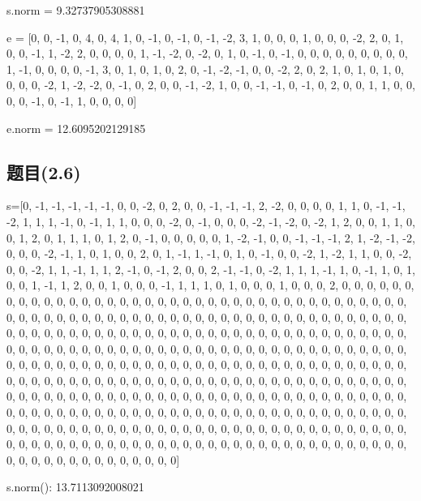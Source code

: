 \documentclass[12pt,a4paper]{article}
\numberwithin{equation}{section}
\begin{document}
s.norm =  9.32737905308881

\hspace*{\fill}

e = [0, 0, -1, 0, 4, 0, 4, 1, 0, -1, 0, -1, 0, -1, -2, 3, 1, 0, 0, 0, 1, 0, 0, 0, -2, 2, 0, 1, 0, 0, -1, 1, -2, 2, 0, 0, 0, 0, 1, -1, -2, 0, -2, 0, 1, 0, -1, 0, -1, 0, 0, 0, 0, 0, 0, 0, 0, 0, 1, -1, 0, 0, 0, 0, -1, 3, 0, 1, 0, 1, 0, 2, 0, -1, -2, -1, 0, 0, -2, 2, 0, 2, 1, 0, 1, 0, 1, 0, 0, 0, 0, -2, 1, -2, -2, 0, -1, 0, 2, 0, 0, -1, -2, 1, 0, 0, -1, -1, 0, -1, 0, 2, 0, 0, 1, 1, 0, 0, 0, 0, -1, 0, -1, 1, 0, 0, 0, 0]

e.norm = 12.6095202129185

\subsection{题目(2.6)}

s=[0, -1, -1, -1, -1, -1, 0, 0, -2, 0, 2, 0, 0, -1, -1, -1, 2, -2, 0, 0, 0, 0, 1, 1, 0, -1, -1, -2, 1, 1, 1, -1, 0, -1, 1, 1, 0, 0, 0, -2, 0, -1, 0, 0, 0, -2, -1, -2, 0, -2, 1, 2, 0, 0, 1, 1, 0, 0, 1, 2, 0, 1, 1, 1, 0, 1, 2, 0, -1, 0, 0, 0, 0, 0, 1, -2, -1, 0, 0, -1, -1, -1, 2, 1, -2, -1, -2, 0, 0, 0, -2, -1, 1, 0, 1, 0, 0, 2, 0, 1, -1, 1, -1, 0, 1, 0, -1, 0, 0, -2, 1, -2, 1, 1, 0, 0, -2, 0, 0, -2, 1, 1, -1, 1, 1, 2, -1, 0, -1, 2, 0, 0, 2, -1, -1, 0, -2, 1, 1, 1, -1, 1, 0, -1, 1, 0, 1, 0, 0, 1, -1, 1, 2, 0, 0, 1, 0, 0, 0, -1, 1, 1, 1, 0, 1, 0, 0, 0, 1, 0, 0, 0, 2, 0, 0, 0, 0, 0, 0, 0, 0, 0, 0, 0, 0, 0, 0, 0, 0, 0, 0, 0, 0, 0, 0, 0, 0, 0, 0, 0, 0, 0, 0, 0, 0, 0, 0, 0, 0, 0, 0, 0, 0, 0, 0, 0, 0, 0, 0, 0, 0, 0, 0, 0, 0, 0, 0, 0, 0, 0, 0, 0, 0, 0, 0, 0, 0, 0, 0, 0, 0, 0, 0, 0, 0, 0, 0, 0, 0, 0, 0, 0, 0, 0, 0, 0, 0, 0, 0, 0, 0, 0, 0, 0, 0, 0, 0, 0, 0, 0, 0, 0, 0, 0, 0, 0, 0, 0, 0, 0, 0, 0, 0, 0, 0, 0, 0, 0, 0, 0, 0, 0, 0, 0, 0, 0, 0, 0, 0, 0, 0, 0, 0, 0, 0, 0, 0, 0, 0, 0, 0, 0, 0, 0, 0, 0, 0, 0, 0, 0, 0, 0, 0, 0, 0, 0, 0, 0, 0, 0, 0, 0, 0, 0, 0, 0, 0, 0, 0, 0, 0, 0, 0, 0, 0, 0, 0, 0, 0, 0, 0, 0, 0, 0, 0, 0, 0, 0, 0, 0, 0, 0, 0, 0, 0, 0, 0, 0, 0, 0, 0, 0, 0, 0, 0, 0, 0, 0, 0, 0, 0, 0, 0, 0, 0, 0, 0, 0, 0, 0, 0, 0, 0, 0, 0, 0, 0, 0, 0, 0, 0, 0, 0, 0, 0, 0, 0, 0, 0, 0, 0, 0, 0, 0, 0, 0, 0, 0, 0, 0, 0, 0, 0, 0, 0, 0, 0, 0, 0, 0, 0, 0, 0, 0, 0, 0, 0, 0, 0, 0, 0, 0, 0, 0, 0, 0, 0, 0, 0, 0, 0, 0, 0, 0, 0, 0, 0, 0, 0, 0, 0, 0, 0, 0, 0, 0, 0, 0, 0, 0, 0, 0, 0, 0, 0, 0, 0, 0, 0, 0, 0, 0, 0, 0, 0, 0, 0, 0, 0, 0, 0, 0, 0, 0, 0, 0, 0, 0, 0, 0, 0, 0, 0, 0, 0, 0, 0, 0, 0, 0, 0, 0, 0]

s.norm(): 13.7113092008021
\end{document}
